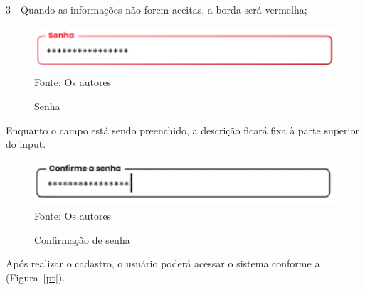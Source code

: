 \documentclass[12pt,a4paper]{article}
\begin{document}
\begin{itemize}
        3 - Quando as informações não forem aceitas, a borda será vermelha; 
                \begin{figure}[H]
                                \centering
                                \caption{Senha}
                                \includegraphics[width=15cm]{prot14.png}
                                Fonte: Os autores
                            \end{figure} 
        Enquanto o campo está sendo preenchido, a descrição ficará fixa à parte superior do input.
                 \begin{figure}[H]
                                \centering
                                \caption{Confirmação de senha}
                                \includegraphics[width=15cm]{prot15.png}
                                Fonte: Os autores
                            \end{figure}
        Após realizar o cadastro, o usuário poderá acessar o sistema conforme a (Figura~\ref{pt}).
\end{itemize}

\newpage
\end{document}
